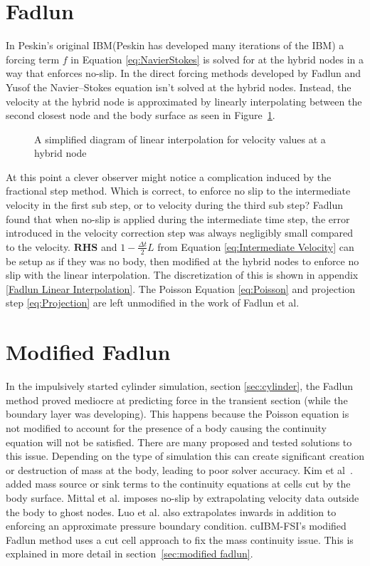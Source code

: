 \documentclass[onehalf,11pt]{beavtex}
\begin{document}
\section{Fadlun}
In Peskin's\cite{Peskin:1972gh} original IBM(Peskin has developed many iterations of the IBM) a forcing term $f$ in Equation \eqref{eq:NavierStokes} is solved for at the hybrid nodes in a way that enforces no-slip. 
In the direct forcing methods developed by Fadlun\cite{Fadlun:2000fl} and Yusof\cite{MohdYusof:1997wh} the Navier--Stokes equation isn't solved at the hybrid nodes. 
Instead, the velocity at the hybrid node is approximated by linearly interpolating between the second closest node and the body surface as seen in Figure~\ref{fig:2}. 
\begin{figure}[!htb]
	\centering
	
	\caption{A simplified diagram of linear interpolation for velocity values at a hybrid node}
	\label{fig:2}
\end{figure}
At this point a clever observer might notice a complication induced by the fractional step method. 
Which is correct, to enforce no slip to the intermediate velocity in the first sub step, or to velocity during the third sub step? 
Fadlun found that when no-slip is applied during the intermediate time step, the error introduced in the velocity correction step was always negligibly small compared to the velocity. 
$\textbf{RHS}$ and $1-\frac{\Delta t}{2}L$ from Equation \eqref{eq:Intermediate Velocity} can be setup as if they was no body, then modified at the hybrid nodes to enforce no slip with the linear interpolation. 
The discretization of this is shown in appendix \ref{Fadlun Linear Interpolation}. 
The Poisson Equation \ref{eq:Poisson} and projection step \ref{eq:Projection} are left unmodified in the work of Fadlun et al. 

\section{Modified Fadlun} 
In the impulsively started cylinder simulation, section \ref{sec:cylinder}, the Fadlun method proved mediocre at predicting force in the transient section (while the boundary layer was developing). 
This happens because the Poisson equation is not modified to account for the presence of a body causing the continuity equation will not be satisfied. 
There are many proposed and tested solutions to this issue. 
Depending on the type of simulation this can create significant creation or destruction of mass at the body, leading to poor solver accuracy.
Kim et al~\cite{kim2001immersed}. added mass source or sink terms to the continuity equations at cells cut by the body surface. 
Mittal et al\cite{mittal2008versatile}. imposes no-slip by extrapolating velocity data outside the body to ghost nodes. 
Luo et al\cite{Luo:2012gx}. also extrapolates inwards in addition to enforcing an approximate pressure boundary condition. 
cuIBM-FSI's modified Fadlun method uses a cut cell approach to fix the mass continuity issue. 
This is explained in more detail in section~\ref{sec:modified fadlun}.
\end{document}
